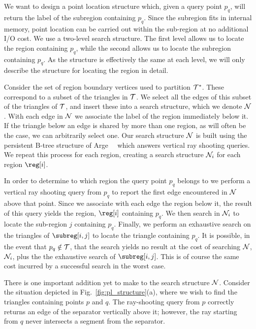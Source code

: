 We want to design a point location structure which, given a query point $p_q$, 
will return the label of the subregion containing $p_q$. 
Since the subregion fits in internal memory, point location can be carried
out within the sub-region at no additional I/O cost.
We use a two-level search structure.  
The first level allows us to locate the region containing $p_q$, while the 
second allows us to locate the subregion containing $p_q$.
As the  structure is effectively the same at each level, we will only 
describe the structure for locating the region in detail.

Consider the set of region boundary vertices used to partition $\mathcal{T}^*$. 
These correspond to a subset of the triangles in $\mathcal{T}$.
We select all the edges of this subset of the triangles of $\mathcal{T}$,
and insert these into a search structure, which we denote $\mathcal{N}$.
With each edge in $\mathcal{N}$ we associate the label of the region
immediately below it.
If the triangle below an edge is shared by more than one region, as
will often be the case, we can arbitrarily select one. 
Our search structure $\mathcal{N}$ is built using the persistent B-tree structure of 
Arge~\etal~\cite{DBLP:conf/alenex/ArgeDT03} which answers vertical
ray shooting queries.
We repeat this process for each region, creating a search structure
$\mathcal{N}_i$ for each region $\reg[i]$.


In order to determine to which region the query point $p_q$ belongs to we perform a vertical 
ray shooting query from $p_q$ to report the first edge encountered in $\mathcal{N}$
above that point. 
Since we associate with each edge the region below it, the result of this query 
yields the region, $\reg[i]$ containing $p_q$.
We then search in $\mathcal{N}_i$ to locate the sub-region $j$ containing $p_q$.
Finally, we perform an exhaustive search on the triangles of $\subreg[i,j]$
to locate the triangle containing $p_q$.
It is possible, in the event that $p_q \notin \mathcal{T}$, that the search yields
no result at the cost of searching $\mathcal{N}$, $\mathcal{N}_i$, plus the
the exhaustive search of $\subreg[i,j]$.
This is of course the same cost incurred by a successful search in the worst
case.

There is one important addition yet to make to the search structure $\mathcal{N}$.
Consider the situation depicted in Fig.~\ref{fig:pl_structure}(a), where
we wish to find the triangles containing points $p$ and $q$. 
The ray-shooting query from $p$ correctly returns an edge of the separator
vertically above it; however, the ray starting from $q$ never intersects a 
segment from the separator.

